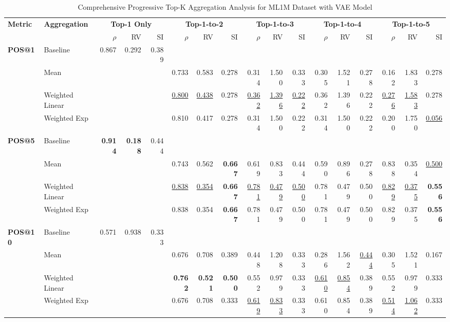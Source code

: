 \documentclass{article}
\begin{document}
\begin{table}[htbp]
\centering
\caption{Comprehensive Progressive Top-K Aggregation Analysis for ML1M Dataset with VAE Model}
\label{tab:ml1m_vae_progressive_topk_comprehensive}
\scriptsize
\begin{tabular}{@{}llrrr|rrr|rrr|rrr|rrr@{}}
\toprule
\multirow{2}{*}{\textbf{Metric}} & \multirow{2}{*}{\textbf{Aggregation}} & \multicolumn{3}{c|}{\textbf{Top-1 Only}} & \multicolumn{3}{c|}{\textbf{Top-1-to-2}} & \multicolumn{3}{c|}{\textbf{Top-1-to-3}} & \multicolumn{3}{c|}{\textbf{Top-1-to-4}} & \multicolumn{3}{c}{\textbf{Top-1-to-5}} \\
\cmidrule(lr){3-5} \cmidrule(lr){6-8} \cmidrule(lr){9-11} \cmidrule(lr){12-14} \cmidrule(lr){15-17}
& & $\rho$ & RV & SI & $\rho$ & RV & SI & $\rho$ & RV & SI & $\rho$ & RV & SI & $\rho$ & RV & SI \\
\midrule

\multirow{4}{*}{\textbf{POS@1}} 
& Baseline & 0.867 & 0.292 & 0.389 & & & & & & & & & & & & \\
& Mean & & & & 0.733 & 0.583 & 0.278 & 0.314 & 1.500 & 0.333 & 0.305 & 1.521 & 0.278 & 0.162 & 1.833 & 0.278 \\
& Weighted Linear & & & & \uline{0.800} & \uline{0.438} & 0.278 & \uline{0.362} & \uline{1.396} & \uline{0.222} & 0.362 & 1.396 & 0.222 & \uline{0.276} & \uline{1.583} & 0.278 \\
& Weighted Exp & & & & 0.810 & 0.417 & 0.278 & 0.314 & 1.500 & 0.222 & 0.314 & 1.500 & 0.222 & 0.200 & 1.750 & \uline{0.056} \\
\midrule

\multirow{4}{*}{\textbf{POS@5}} 
& Baseline & \textbf{0.914} & \textbf{0.188} & 0.444 & & & & & & & & & & & & \\
& Mean & & & & 0.743 & 0.562 & \textbf{0.667} & 0.619 & 0.833 & 0.444 & 0.590 & 0.896 & 0.278 & 0.838 & 0.354 & \uline{0.500} \\
& Weighted Linear & & & & \uline{0.838} & \uline{0.354} & \textbf{0.667} & \uline{0.781} & \uline{0.479} & \uline{0.500} & 0.781 & 0.479 & 0.500 & \uline{0.829} & \uline{0.375} & \textbf{0.556} \\
& Weighted Exp & & & & 0.838 & 0.354 & \textbf{0.667} & 0.781 & 0.479 & 0.500 & 0.781 & 0.479 & 0.500 & 0.829 & 0.375 & \textbf{0.556} \\
\midrule

\multirow{4}{*}{\textbf{POS@10}} 
& Baseline & 0.571 & 0.938 & 0.333 & & & & & & & & & & & & \\
& Mean & & & & 0.676 & 0.708 & 0.389 & 0.448 & 1.208 & 0.333 & 0.286 & 1.562 & \uline{0.444} & 0.305 & 1.521 & 0.167 \\
& Weighted Linear & & & & \textbf{0.762} & \textbf{0.521} & \textbf{0.500} & 0.552 & 0.979 & 0.333 & \uline{0.610} & \uline{0.854} & 0.389 & 0.552 & 0.979 & 0.333 \\
& Weighted Exp & & & & 0.676 & 0.708 & 0.333 & \uline{0.619} & \uline{0.833} & 0.333 & 0.610 & 0.854 & 0.389 & \uline{0.514} & \uline{1.062} & 0.333 \\
\midrule


\end{tabular}
\end{table}
\end{document}
